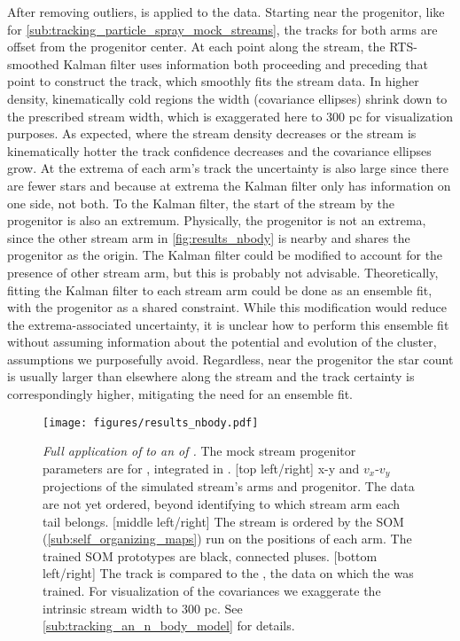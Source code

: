 \documentclass[fleqn,usenatbib]{mnras}
\begin{document}
    After removing outliers, \trackstream{} is applied to the data. Starting
    near the progenitor, like for
    \autoref{sub:tracking_particle_spray_mock_streams}, the tracks for both arms
    are offset from the progenitor center. At each point along the stream, the
    RTS-smoothed Kalman filter uses information both proceeding and preceding
    that point to construct the track, which smoothly fits the stream data. In
    higher density, kinematically cold regions the width (covariance ellipses)
    shrink down to the prescribed stream width, which is exaggerated here to 300
    pc for visualization purposes. As expected, where the stream density
    decreases or the stream is kinematically hotter the track confidence
    decreases and the covariance ellipses grow. At the extrema of each arm's
    track the uncertainty is also large since there are fewer stars and because
    at extrema the Kalman filter only has information on one side, not both. To
    the Kalman filter, the start of the stream by the progenitor is also an
    extremum. Physically, the progenitor is not an extrema, since the other
    stream arm in \autoref{fig:results_nbody} is nearby and shares the
    progenitor as the origin. The Kalman filter could be modified to account for
    the presence of other stream arm, but this is probably not advisable.
    Theoretically, fitting the Kalman filter to each stream arm could be done as
    an ensemble fit, with the progenitor as a shared constraint. While this
    modification would reduce the extrema-associated uncertainty, it is unclear
    how to perform this ensemble fit without assuming information about the
    potential and evolution of the cluster, assumptions we purposefully avoid.
    Regardless, near the progenitor the star count is usually larger than
    elsewhere along the stream and the track certainty is correspondingly
    higher, mitigating the need for an ensemble fit.

    \begin{figure*}
      \centering
      \texttt{[image: figures/results\_nbody.pdf]}
      \caption{
        \emph{Full application of} \trackstream{} \emph{to an \nbody{}
        of .} The mock stream progenitor parameters
        are for , integrated in \galpyMWPotential.
        [top left/right] x-y and $v_x$-$v_y$ projections of the simulated
        stream's arms and progenitor. The data are not yet ordered, beyond
        identifying to which stream arm each tail belongs.
        [middle left/right] The stream is ordered by the SOM
        (\autoref{sub:self_organizing_maps}) run on the positions of each arm.
        The trained SOM prototypes are black, connected pluses.
        [bottom left/right] The \trackstream{} track is compared to the
        \nbody{}, the data on which the \trackstream{} was trained. For
        visualization of the covariances we exaggerate the intrinsic stream
        width to 300 pc. See \autoref{sub:tracking_an_n_body_model} for details.
        }
      \label{fig:results_nbody}
    \end{figure*}
\end{document}
